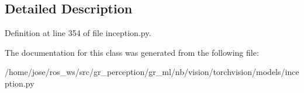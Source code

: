\subsection{Detailed Description}


Definition at line 354 of file inception.\+py.



The documentation for this class was generated from the following file\+:\begin{DoxyCompactItemize}
\item 
/home/jose/ros\+\_\+ws/src/gr\+\_\+perception/gr\+\_\+ml/nb/vision/torchvision/models/inception.\+py\end{DoxyCompactItemize}
